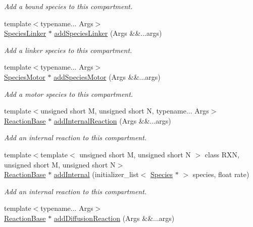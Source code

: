 \begin{DoxyCompactItemize}
\begin{DoxyCompactList}\small\item\em Add a bound species to this compartment. \end{DoxyCompactList}\item 
{\footnotesize template$<$typename... Args$>$ }\\\hyperlink{classSpeciesLinker}{Species\+Linker} $\ast$ \hyperlink{classCompartment_a8dd9a0be22dc34bcd5332fd6118d29ca}{add\+Species\+Linker} (Args \&\&...args)
\begin{DoxyCompactList}\small\item\em Add a linker species to this compartment. \end{DoxyCompactList}\item 
{\footnotesize template$<$typename... Args$>$ }\\\hyperlink{classSpeciesMotor}{Species\+Motor} $\ast$ \hyperlink{classCompartment_a77546142c0deb95f7b9ecdd54b2ba8fa}{add\+Species\+Motor} (Args \&\&...args)
\begin{DoxyCompactList}\small\item\em Add a motor species to this compartment. \end{DoxyCompactList}\item 
{\footnotesize template$<$unsigned short M, unsigned short N, typename... Args$>$ }\\\hyperlink{classReactionBase}{Reaction\+Base} $\ast$ \hyperlink{classCompartment_a0d1d665e2823cf70cae3005a50ebc1e2}{add\+Internal\+Reaction} (Args \&\&...args)
\begin{DoxyCompactList}\small\item\em Add an internal reaction to this compartment. \end{DoxyCompactList}\item 
{\footnotesize template$<$template$<$ unsigned short M, unsigned short N $>$ class R\+X\+N, unsigned short M, unsigned short N$>$ }\\\hyperlink{classReactionBase}{Reaction\+Base} $\ast$ \hyperlink{classCompartment_ae6ad2810e9c10118ce24bd27acdbfa39}{add\+Internal} (initializer\+\_\+list$<$ \hyperlink{classSpecies}{Species} $\ast$ $>$ species, float rate)
\begin{DoxyCompactList}\small\item\em Add an internal reaction to this compartment. \end{DoxyCompactList}\item 
{\footnotesize template$<$typename... Args$>$ }\\\hyperlink{classReactionBase}{Reaction\+Base} $\ast$ \hyperlink{classCompartment_a3ebe5c29d9e7f334c7f0da97d5a60dad}{add\+Diffusion\+Reaction} (Args \&\&...args)

\end{DoxyCompactItemize}

